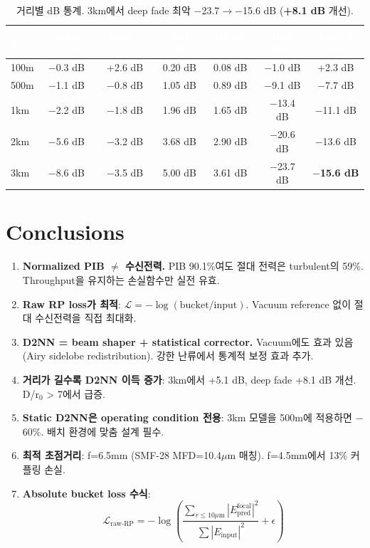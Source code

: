 \documentclass[11pt,a4paper]{article}
\newcommand{\good}[1]{\textcolor{greengood}{\textbf{#1}}}
\begin{document}
\begin{table}[H]
\centering\small
\begin{tabular}{l c c c c c c}
\toprule
\rowcolor{tableheader}\textcolor{white}{\textbf{L}} & \textcolor{white}{\textbf{Turb mean}} & \textcolor{white}{\textbf{D2NN mean}} & \textcolor{white}{\textbf{Turb std}} & \textcolor{white}{\textbf{D2NN std}} & \textcolor{white}{\textbf{Turb min}} & \textcolor{white}{\textbf{D2NN min}} \\
\midrule
100m & $-$0.3 dB & +2.6 dB & 0.20 dB & 0.08 dB & $-$1.0 dB & +2.3 dB \\
\rowcolor{tablealt}500m & $-$1.1 dB & $-$0.8 dB & 1.05 dB & 0.89 dB & $-$9.1 dB & $-$7.7 dB \\
1km & $-$2.2 dB & $-$1.8 dB & 1.96 dB & 1.65 dB & $-$13.4 dB & $-$11.1 dB \\
\rowcolor{tablealt}2km & $-$5.6 dB & $-$3.2 dB & 3.68 dB & 2.90 dB & $-$20.6 dB & $-$13.6 dB \\
3km & $-$8.6 dB & $-$3.5 dB & 5.00 dB & 3.61 dB & $-$23.7 dB & \good{$-$15.6 dB} \\
\bottomrule
\end{tabular}
\caption{거리별 dB 통계. 3km에서 deep fade 최악 $-$23.7$\rightarrow$$-$15.6 dB (\good{+8.1 dB} 개선).}
\end{table}


\section{Conclusions}

\begin{enumerate}
\item \textbf{Normalized PIB $\neq$ 수신전력.} PIB 90.1\%여도 절대 전력은 turbulent의 59\%.
    Throughput을 유지하는 손실함수만 실전 유효.

\item \textbf{Raw RP loss가 최적}: $\mathcal{L} = -\log(\text{bucket}/\text{input})$.
    Vacuum reference 없이 절대 수신전력을 직접 최대화.

\item \textbf{D2NN = beam shaper + statistical corrector.}
    Vacuum에도 효과 있음 (Airy sidelobe redistribution).
    강한 난류에서 통계적 보정 효과 추가.

\item \textbf{거리가 길수록 D2NN 이득 증가}: 3km에서 +5.1 dB, deep fade +8.1 dB 개선.
    D/r$_0$ > 7에서 급증.

\item \textbf{Static D2NN은 operating condition 전용}: 3km 모델을 500m에 적용하면 $-$60\%.
    배치 환경에 맞춤 설계 필수.

\item \textbf{최적 초점거리}: f=6.5mm (SMF-28 MFD=10.4$\mu$m 매칭).
    f=4.5mm에서 13\% 커플링 손실.

\item \textbf{Absolute bucket loss 수식}:
    \[
    \mathcal{L}_{\text{raw-RP}} = -\log\!\left(\frac{\sum_{r \leq 10\mu\text{m}} |E_{\text{pred}}^{\text{focal}}|^2}
    {\sum |E_{\text{input}}|^2} + \epsilon\right)
    \]
\end{enumerate}
\end{document}
